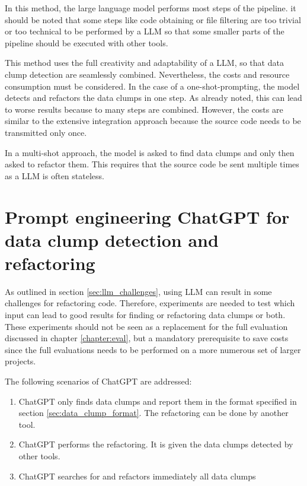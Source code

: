 In this method, the large language model performs most steps of the pipeline. it should be noted that some steps like code obtaining or file filtering are too trivial or too technical to be performed by a \ac{LLM} so that some smaller parts of the pipeline should be executed with other tools. 

This method uses the full creativity and adaptability of a \ac{LLM}, so that data clump detection are seamlessly combined. Nevertheless, the costs and resource consumption must be considered. In the case of a one-shot-prompting, the model detects and refactors the data clumps in one step. As already noted, this can lead to worse results because to many steps are combined. However, the costs are similar to the  extensive integration approach because the source code needs to be transmitted only once. 

In a multi-shot approach, the model is asked to find data clumps and only then asked to refactor them. This requires that the source code be sent multiple times as a \ac{LLM} is often stateless. 

\section{Prompt engineering ChatGPT for data clump detection and refactoring}\label{sec:prompt_engineering_impl}

As outlined in  section \ref{sec:llm_challenges}, using \ac{LLM} can result in some challenges for refactoring code. Therefore, experiments are needed to test which input can lead to good results for finding or refactoring data clumps or both. These experiments should not be seen as a replacement for the full evaluation discussed in chapter \ref{chapter:eval}, but a mandatory prerequisite to save costs since the full evaluations needs to be performed on a more numerous set of larger projects.

The following scenarios of ChatGPT are addressed:
\begin{enumerate}
    \item ChatGPT only finds data clumps and report them in the format specified in section \ref{sec:data_clump_format}. The refactoring can be done by another tool.
    \item ChatGPT performs the refactoring. It is given the data clumps detected by other tools. 
    \item ChatGPT searches for and refactors immediately all data clumps
\end{enumerate}

